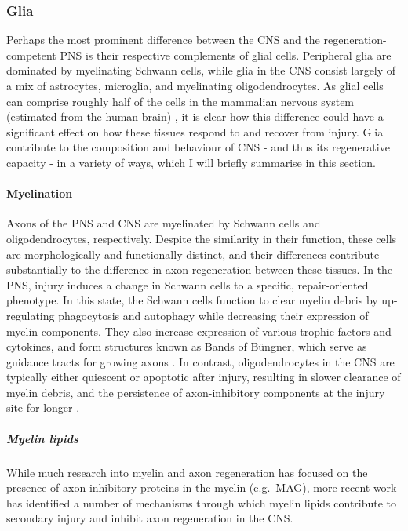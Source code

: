 \documentclass[
]{book}
\begin{document}
\hypertarget{glia}{%
\subsubsection{Glia}\label{glia}}

Perhaps the most prominent difference between the CNS and the regeneration-competent PNS is their respective complements of glial cells. Peripheral glia are dominated by myelinating Schwann cells, while glia in the CNS consist largely of a mix of astrocytes, microglia, and myelinating oligodendrocytes. As glial cells can comprise roughly half of the cells in the mammalian nervous system (estimated from the human brain) \citep{vonbartheldSearchTrueNumbers2016}, it is clear how this difference could have a significant effect on how these tissues respond to and recover from injury. Glia contribute to the composition and behaviour of CNS - and thus its regenerative capacity - in a variety of ways, which I will briefly summarise in this section.

\hypertarget{myelination}{%
\paragraph{Myelination}\label{myelination}}

Axons of the PNS and CNS are myelinated by Schwann cells and oligodendrocytes, respectively. Despite the similarity in their function, these cells are morphologically and functionally distinct, and their differences contribute substantially to the difference in axon regeneration between these tissues. In the PNS, injury induces a change in Schwann cells to a specific, repair-oriented phenotype. In this state, the Schwann cells function to clear myelin debris by up-regulating phagocytosis and autophagy while decreasing their expression of myelin components. They also increase expression of various trophic factors and cytokines, and form structures known as Bands of Büngner, which serve as guidance tracts for growing axons \citep{jessenRepairSchwannCell2016}. In contrast, oligodendrocytes in the CNS are typically either quiescent or apoptotic after injury, resulting in slower clearance of myelin debris, and the persistence of axon-inhibitory components at the injury site for longer \citep{vargasWhyWallerianDegeneration2007}.

\hypertarget{myelin-lipids}{%
\subparagraph{Myelin lipids}\label{myelin-lipids}}

While much research into myelin and axon regeneration has focused on the presence of axon-inhibitory proteins in the myelin (e.g.~MAG), more recent work has identified a number of mechanisms through which myelin lipids contribute to secondary injury and inhibit axon regeneration in the CNS.
\end{document}
